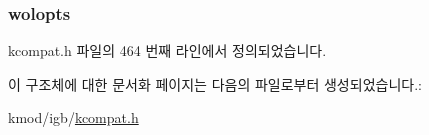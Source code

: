 \subsubsection[{\texorpdfstring{wolopts}{wolopts}}]{ wolopts}\hypertarget{structethtool__wolinfo_abaf252440354967181960eedd49a4580}{}\label{structethtool__wolinfo_abaf252440354967181960eedd49a4580}


kcompat.\+h 파일의 464 번째 라인에서 정의되었습니다.



이 구조체에 대한 문서화 페이지는 다음의 파일로부터 생성되었습니다.\+:\begin{DoxyCompactItemize}
\item 
kmod/igb/\hyperlink{kcompat_8h}{kcompat.\+h}\end{DoxyCompactItemize}
